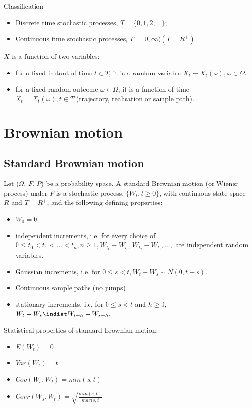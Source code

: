 \documentclass[11pt,a4paper]{book}
\theoremstyle{definition}\newtheorem{definition}{Definition}
\theoremstyle{definition}\newtheorem{fact}{Fact}
\theoremstyle{definition}\newtheorem{remark}{Remark}
\theoremstyle{definition}\newtheorem{ex}{Ex.}
\theoremstyle{definition}\newtheorem{project}{Project}
\theoremstyle{definition}\newtheorem{problem}{Problem}
\theoremstyle{definition}\newtheorem{example}{Example}
\numberwithin{theorem}{section}
\numberwithin{corollary}{chapter}
\numberwithin{assumption}{chapter}
\numberwithin{definition}{chapter}
\numberwithin{prop}{chapter}
\numberwithin{notation}{chapter}
\numberwithin{problem}{chapter}
\numberwithin{example}{chapter}
\numberwithin{fact}{chapter}
\numberwithin{ex}{chapter}
\begin{document}
Classification
\begin{itemize}
\item Discrete time stochastic processes, $T = \{0,1,2,...\}$;
\item Continuous time stochastic processes, $T = [0, \infty) (T = R^{+})$
\end{itemize}

$X$ is a function of two variables:
\begin{itemize}
\item for a fixed instant of time $t \in T$, it is a random variable $X_t = X_t(\omega), \omega \in \Omega$.
\item for a fixed random outcome $\omega \in \Omega$, it is a function of time $X_t = X_t(\omega), t \in T$ (trajectory, realisation or sample path).
\end{itemize}

\section{Brownian motion}

\subsection{Standard Brownian motion}
Let ($\Omega$, $F$, $P$) be a probability space. A standard Brownian motion (or Wiener process) under $P$ is a stochastic process, $\{W_t, t \geq 0 \}$, with continuous state space $R$ and $T = R^{+}$, and the following defining properties:
\begin{itemize}
\item $W_0 = 0$
\item independent increments, i.e. for every choice of $0 \leq t_0 < t_1 < ... < t_n, n \geq 1, W_{t_1} - W_{t_0}, W_{t_2} - W_{t_1}, ...,$ are independent random variables.
\item Gaussian increments, i.e. for $0 \leq s < t, W_t - W_s \sim N(0, t-s)$.
\item Continuous sample paths (no jumps)
\item stationary increments, i.e. for $0 \leq s < t$ and $h \geq 0$, $W_t - W_s \indist W_{t+h} - W_{s+h} $.
\end{itemize}

Statistical properties of standard Brownian motion:
\begin{itemize}
\item $E(W_t) = 0$
\item $Var(W_t) = t$
\item $Cov(W_s, W_t) = min(s,t)$
\item $Corr(W_s, W_t) = \sqrt{\frac{min(s,t)}{max(s,t}}$
\end{itemize}
\end{document}

